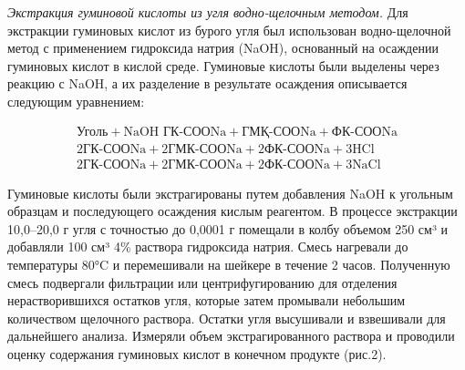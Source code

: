 \begin{multicols}{2}
\emph{Экстракция гуминовой кислоты из угля водно-щелочным методом.} Для
экстракции гуминовых кислот из бурого угля был использован
водно-щелочной метод с применением гидроксида натрия (NaOH), основанный
на осаждении гуминовых кислот в кислой среде. Гуминовые кислоты были
выделены через реакцию с NaOH, а их разделение в результате осаждения
описывается следующим уравнением:
\end{multicols}

\begin{equation}
\begin{aligned}
\text{Уголь} + \text{NaOH} \text{ ГК-СООNa} + \text{ГМҚ-СООNa} + \text{ФК-СООNa}\\
2\text{ГК-СООNa} + 2\text{ГМК-СООNa} + 2\text{ФК-СООNa} + 3\text{HCl}\\
2\text{ГК-СООNa} + 2\text{ГМК-СООNa} + 2\text{ФК-СООNa} + 3\text{NaCl}
\end{aligned}
\end{equation}

\begin{multicols}{2}
Гуминовые кислоты были экстрагированы путем добавления NaOH к угольным
образцам и последующего осаждения кислым реагентом. В процессе
экстракции 10,0--20,0 г угля с точностью до 0,0001 г помещали в колбу
объемом 250 см³ и добавляли 100 см³ 4\% раствора гидроксида натрия.
Смесь нагревали до температуры 80°C и перемешивали на шейкере в течение
2 часов. Полученную смесь подвергали фильтрации или центрифугированию
для отделения нерастворившихся остатков угля, которые затем промывали
небольшим количеством щелочного раствора. Остатки угля высушивали и
взвешивали для дальнейшего анализа. Измеряли объем экстрагированного
раствора и проводили оценку содержания гуминовых кислот в конечном
продукте (рис.2).
\end{multicols}

